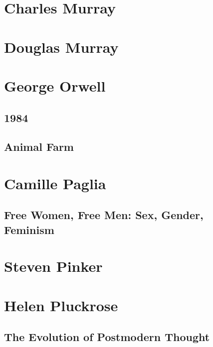 \documentclass[10pt,titlepage]{book}
\begin{document}
\section{Charles Murray \cite{murrayc-tbc,murrayc-hd}}

\section{Douglas Murray}

\cite{murrayd-vi,murrayd-sde,murrayd-tmc}

\section{George Orwell}

\subsection{1984}

\cite{orwell-1984}

\subsection{Animal Farm \cite{orwell-af}}

\section{Camille Paglia}

\subsection{Free Women, Free Men: Sex, Gender, Feminism \cite{paglia-fw}}

\section{Steven Pinker}

\cite{pinker-tbs,pinker-angels,pinker-en}

\section{Helen Pluckrose}

\subsection{The Evolution of Postmodern Thought}\label{EPT}
\end{document}
